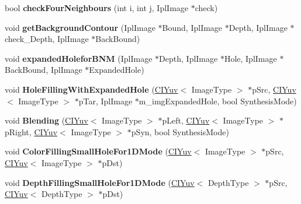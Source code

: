 \begin{DoxyCompactItemize}
\mbox{\label{class_c_boundary_noise_removal_a7d8dd1ad71c2a4424b452f370897fcfb}} 
bool {\bfseries check\+Four\+Neighbours} (int i, int j, Ipl\+Image $\ast$check)
\item 
\mbox{\label{class_c_boundary_noise_removal_a0e755442e349f67a2357b6e9d4e0d2f9}} 
void {\bfseries get\+Background\+Contour} (Ipl\+Image $\ast$Bound, Ipl\+Image $\ast$Depth, Ipl\+Image $\ast$check\+\_\+\+Depth, Ipl\+Image $\ast$Back\+Bound)
\item 
\mbox{\label{class_c_boundary_noise_removal_a5d1610bdadb1ea56572146f69d0589a7}} 
void {\bfseries expanded\+Holefor\+B\+NM} (Ipl\+Image $\ast$Depth, Ipl\+Image $\ast$Hole, Ipl\+Image $\ast$Back\+Bound, Ipl\+Image $\ast$Expanded\+Hole)
\item 
\mbox{\label{class_c_boundary_noise_removal_a116434cda7c15247cd365f9ce7bf64aa}} 
void {\bfseries Hole\+Filling\+With\+Expanded\+Hole} (\hyperlink{class_c_i_yuv}{C\+I\+Yuv}$<$ Image\+Type $>$ $\ast$p\+Src, \hyperlink{class_c_i_yuv}{C\+I\+Yuv}$<$ Image\+Type $>$ $\ast$p\+Tar, Ipl\+Image $\ast$m\+\_\+img\+Expanded\+Hole, bool Synthesis\+Mode)
\item 
\mbox{\label{class_c_boundary_noise_removal_af41f24692ceb4202eaf2d716b856aca2}} 
void {\bfseries Blending} (\hyperlink{class_c_i_yuv}{C\+I\+Yuv}$<$ Image\+Type $>$ $\ast$p\+Left, \hyperlink{class_c_i_yuv}{C\+I\+Yuv}$<$ Image\+Type $>$ $\ast$p\+Right, \hyperlink{class_c_i_yuv}{C\+I\+Yuv}$<$ Image\+Type $>$ $\ast$p\+Syn, bool Synthesis\+Mode)
\item 
\mbox{\label{class_c_boundary_noise_removal_a5b8f3a3c9da4ac9df31b866519fe4b8f}} 
void {\bfseries Color\+Filling\+Small\+Hole\+For1\+D\+Mode} (\hyperlink{class_c_i_yuv}{C\+I\+Yuv}$<$ Image\+Type $>$ $\ast$p\+Src, \hyperlink{class_c_i_yuv}{C\+I\+Yuv}$<$ Image\+Type $>$ $\ast$p\+Dst)
\item 
\mbox{\label{class_c_boundary_noise_removal_aa15f6efee18f6a5468690b01819b72c8}} 
void {\bfseries Depth\+Filling\+Small\+Hole\+For1\+D\+Mode} (\hyperlink{class_c_i_yuv}{C\+I\+Yuv}$<$ Depth\+Type $>$ $\ast$p\+Src, \hyperlink{class_c_i_yuv}{C\+I\+Yuv}$<$ Depth\+Type $>$ $\ast$p\+Dst)

\end{DoxyCompactItemize}

